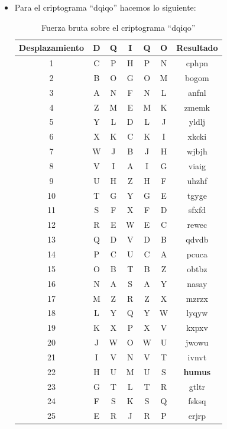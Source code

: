\begin{itemize}

\item Para el criptograma ``dqiqo'' hacemos lo siguiente:

\begin{table}[H]
\centering
\begin{tabular}{|c|c|c|c|c|c|c|}
\hline
\textbf{Desplazamiento} & \textbf{D} & \textbf{Q} & \textbf{I} & \textbf{Q} & \textbf{O} & \textbf{Resultado} \\
\hline
1  & C & P & H & P & N & cphpn \\
2  & B & O & G & O & M & bogom \\
3  & A & N & F & N & L & anfnl \\
4  & Z & M & E & M & K & zmemk \\
5  & Y & L & D & L & J & yldlj \\
6  & X & K & C & K & I & xkcki \\
7  & W & J & B & J & H & wjbjh \\
8  & V & I & A & I & G & viaig \\
9  & U & H & Z & H & F & uhzhf \\
10 & T & G & Y & G & E & tgyge \\
11 & S & F & X & F & D & sfxfd \\
12 & R & E & W & E & C & rewec \\
13 & Q & D & V & D & B & qdvdb \\
14 & P & C & U & C & A & pcuca \\
15 & O & B & T & B & Z & obtbz \\
16 & N & A & S & A & Y & nasay \\
17 & M & Z & R & Z & X & mzrzx \\
18 & L & Y & Q & Y & W & lyqyw \\
19 & K & X & P & X & V & kxpxv \\
20 & J & W & O & W & U & jwowu \\
21 & I & V & N & V & T & ivnvt \\
22 & H & U & M & U & S & \textbf{humus}\\
23 & G & T & L & T & R & gtltr \\
24 & F & S & K & S & Q & fsksq \\
25 & E & R & J & R & P & erjrp \\
\hline
\end{tabular}
\caption{Fuerza bruta sobre el criptograma ``dqiqo''}
\label{tab:cesar}
\end{table}


\end{itemize}
